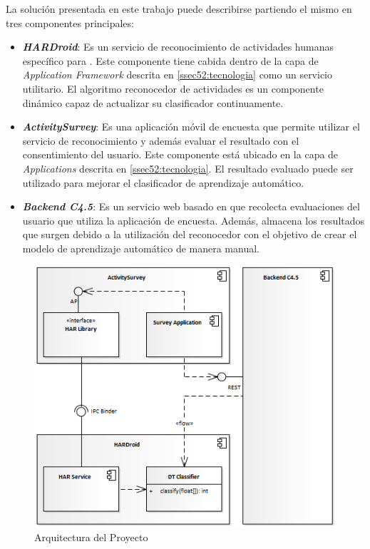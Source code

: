 \label{sec53:arquitectura}La solución presentada en este trabajo
puede describirse partiendo el mismo en tres componentes principales:
\begin{itemize}
\item \textbf{\emph{HARDroid}}: Es un servicio de reconocimiento de actividades
humanas específico para \emph{}. Este componente tiene
cabida dentro de la capa de \emph{Application Framework} descrita
en \ref{ssec52:tecnologia} como un servicio utilitario. El algoritmo
reconocedor de actividades es un componente dinámico capaz de actualizar
su clasificador continuamente.
\item \textbf{\emph{ActivitySurvey}}: Es una aplicación móvil de encuesta
que permite utilizar el servicio de reconocimiento y además evaluar
el resultado con el consentimiento del usuario. Este componente está
ubicado en la capa de \emph{Applications} descrita en \ref{ssec52:tecnologia}.
El resultado evaluado puede ser utilizado para mejorar el clasificador
de aprendizaje automático.
\item \textbf{\emph{Backend C4.5}}: Es un servicio web basado en 
que recolecta evaluaciones del usuario que utiliza la aplicación de
encuesta. Además, almacena los resultados que surgen debido a la utilización
del reconocedor con el objetivo de crear el modelo de aprendizaje
automático de manera manual. 
\end{itemize}
\begin{figure}[H]
\begin{centering}
\includegraphics[width=1\columnwidth]{capitulo-5/graphics/arqui_general}
\par\end{centering}
\caption[Arquitectura del Proyecto]{\label{fig5:arqui-general}Arquitectura del Proyecto}

\end{figure}


